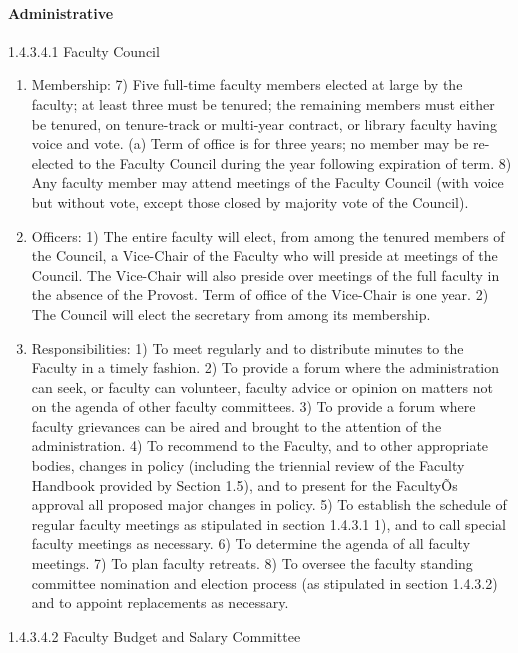 \documentclass[letterpaper, 11pt]{article}
\begin{document}
			\paragraph{Administrative}
				1.4.3.4.1 Faculty Council
				\begin{enumerate}[label=\alph*)]
					\item{Membership:}
					7) Five full-time faculty members elected at large by the faculty; at least three must be tenured; the remaining members must either be tenured, on tenure-track or multi-year contract, or library faculty having voice and vote.
					(a) Term of office is for three years; no member may be re-elected to the Faculty Council during the year following expiration of term.
					8) Any faculty member may attend meetings of the Faculty Council (with voice but without vote, except those closed by majority vote of the Council).
					\item{Officers:}
					1) The entire faculty will elect, from among the tenured members of the Council, a Vice-Chair of the Faculty who will preside at meetings of the Council.  The Vice-Chair will also preside over meetings of the full faculty in the absence of the Provost.  Term of office of the Vice-Chair is one year.
					2) The Council will elect the secretary from among its membership.
					\item{Responsibilities:}
					1) To meet regularly and to distribute minutes to the Faculty in a timely fashion.
					2) To provide a forum where the administration can seek, or faculty can volunteer, faculty advice or opinion on matters not on the agenda of other faculty committees.
					3) To provide a forum where faculty grievances can be aired and brought to the attention of the administration.
					4) To recommend to the Faculty, and to other appropriate bodies, changes in policy (including the triennial review of the Faculty Handbook provided by Section 1.5), and to present for the FacultyÕs approval all proposed major changes in policy.
					5) To establish the schedule of regular faculty meetings as stipulated in section 1.4.3.1 1), and to call special faculty meetings as necessary.
					6) To determine the agenda of all faculty meetings.
					7) To plan faculty retreats.
					8) To oversee the faculty standing committee nomination and election process (as stipulated in section 1.4.3.2)  and to appoint replacements as necessary.
				\end{enumerate}
				1.4.3.4.2   Faculty Budget and Salary Committee
\end{document}
